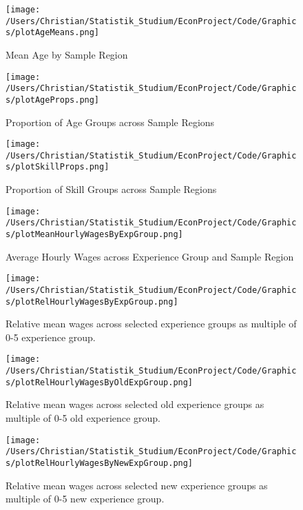 \documentclass{article}
\begin{document}
\begin{figure}[!h]
    \centering
    \texttt{[image: /Users/Christian/Statistik\_Studium/EconProject/Code/Graphics/plotAgeMeans.png]}
    \caption{Mean Age by Sample Region}
    \label{fig:AgeMeans}
\end{figure}

\begin{figure}[!h]
    \centering
    \texttt{[image: /Users/Christian/Statistik\_Studium/EconProject/Code/Graphics/plotAgeProps.png]}
    \caption{Proportion of Age Groups across Sample Regions}
    \label{fig:AgeProps}
\end{figure}

\begin{figure}[!h]
    \centering
    \texttt{[image: /Users/Christian/Statistik\_Studium/EconProject/Code/Graphics/plotSkillProps.png]}
    \caption{Proportion of Skill Groups across Sample Regions}
    \label{fig:SkillProps}
\end{figure}

\begin{figure}[!h]
    \centering
    \texttt{[image: /Users/Christian/Statistik\_Studium/EconProject/Code/Graphics/plotMeanHourlyWagesByExpGroup.png]}
    \caption{Average Hourly Wages across Experience Group and Sample Region}
    \label{fig:MeanHourlyWagesByExpGroup}
\end{figure}

\begin{figure}[!h]
    \centering
    \texttt{[image: /Users/Christian/Statistik\_Studium/EconProject/Code/Graphics/plotRelHourlyWagesByExpGroup.png]}
    \caption{Relative mean wages across selected experience groups as multiple of 0-5 experience group.}
    \label{fig:RelHourlyWagesByExpGroup}
\end{figure}

\begin{figure}[!h]
    \centering
    \texttt{[image: /Users/Christian/Statistik\_Studium/EconProject/Code/Graphics/plotRelHourlyWagesByOldExpGroup.png]}
    \caption{Relative mean wages across selected old experience groups as multiple of 0-5 old experience group.}
    \label{fig:RelHourlyWagesByOldExpGroup}
\end{figure}

\begin{figure}[!h]
    \centering
    \texttt{[image: /Users/Christian/Statistik\_Studium/EconProject/Code/Graphics/plotRelHourlyWagesByNewExpGroup.png]}
    \caption{Relative mean wages across selected new experience groups as multiple of 0-5 new experience group.}
    \label{fig:RelHourlyWagesByNewExpGroup}
\end{figure}
\end{document}
